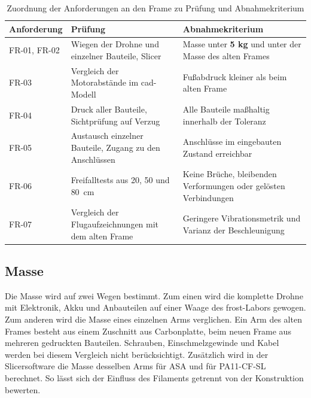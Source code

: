     \begin{table}[H]
        \centering
        \caption{Zuordnung der Anforderungen an den Frame zu Prüfung und Abnahmekriterium}
        \label{tab:Eval_Frame_Anforderungen}
        \small
        \begin{tabularx}{\textwidth}{>{\raggedright\arraybackslash}p{2.1cm} >{\raggedright\arraybackslash}p{4.0cm} X}
            \toprule
            \textbf{Anforderung} & \textbf{Prüfung} & \textbf{Abnahmekriterium} \\
            \midrule
            FR-01, FR-02 & Wiegen der Drohne und einzelner Bauteile, Slicer & Masse unter \textbf{5 kg} und unter der Masse des alten Frames \\
            FR-03 & Vergleich der Motorabstände im \gls{cad}-Modell & Fußabdruck kleiner als beim alten Frame \\
            FR-04 & Druck aller Bauteile, Sichtprüfung auf Verzug & Alle Bauteile maßhaltig innerhalb der Toleranz \\
            FR-05 & Austausch einzelner Bauteile, Zugang zu den Anschlüssen & Anschlüsse im eingebauten Zustand erreichbar \\
            FR-06 & Freifalltests aus 20, 50 und \SI{80}{\centi\metre} & Keine Brüche, bleibenden Verformungen oder gelösten Verbindungen \\
            FR-07 & Vergleich der Flugaufzeichnungen mit dem alten Frame & Geringere Vibrationsmetrik und Varianz der Beschleunigung \\
            \bottomrule
        \end{tabularx}
    \end{table}

        \subsection{Masse}
        \label{sec:Eval_Frame_Masse}

        Die Masse wird auf zwei Wegen bestimmt. Zum einen wird die komplette Drohne mit Elektronik, Akku und Anbauteilen auf einer Waage des \gls{frost}-Labors gewogen. Zum anderen wird die Masse eines einzelnen Arms verglichen. Ein Arm des alten Frames besteht aus einem Zuschnitt aus Carbonplatte, beim neuen Frame aus mehreren gedruckten Bauteilen. Schrauben, Einschmelzgewinde und Kabel werden bei diesem Vergleich nicht berücksichtigt. Zusätzlich wird in der Slicersoftware die Masse desselben Arms für ASA und für PA11-CF-SL berechnet. So lässt sich der Einfluss des Filaments getrennt von der Konstruktion bewerten. %

